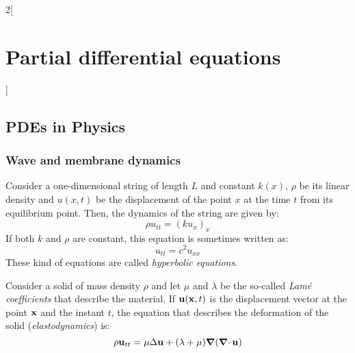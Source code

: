 \documentclass[../../../main_math.tex]{subfiles}
\begin{document}
\renewcommand{\col}{\apl}
\begin{multicols}{2}[\section{Partial differential equations}]
  \subsection{PDEs in Physics}
  \subsubsection{Wave and membrane dynamics}
  \begin{proposition}
    Consider a one-dimensional string of length $L$ and constant $k(x)$, $\rho$ be its linear density and $u(x,t)$ be the displacement of the point $x$ at the time $t$ from its equilibrium point. Then, the dynamics of the string are given by: $$\rho u_{tt}={(ku_x)}_x$$ If both $k$ and $\rho$ are constant, this equation is sometimes written as:
    \begin{equation}\label{PDE_waveeq}
      u_{tt}=c^2u_{xx}
    \end{equation}
    These kind of equations are called \emph{hyperbolic equations}.
  \end{proposition}
  \begin{proposition}
    Consider a solid of mass density $\rho$ and let $\mu$ and $\lambda$ be the so-called \emph{Lamé coefficients} that describe the material. If $\boldsymbol{\mathrm{u}}(\boldsymbol{\mathrm{x}},t)$ is the displacement vector at the point $\boldsymbol{\mathrm{x}}$ and the instant $t$, the equation that describes the deformation of the solid (\emph{elastodynamics}) is:
    $$\rho\boldsymbol{\mathrm{u}}_{tt}=\mu\Delta\boldsymbol{\mathrm{u}}+(\lambda+\mu)\grad(\operatorname{\boldsymbol{\mathrm{\nabla}}\cdot}{\boldsymbol{\mathrm{u}}})$$
  \end{proposition}

\end{multicols}
\end{document}
